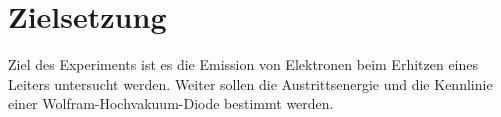 \section{Zielsetzung}
\label{sec:Zielsetzung}

Ziel des Experiments ist es die Emission von Elektronen beim Erhitzen eines Leiters untersucht werden. Weiter sollen die Austrittsenergie und die Kennlinie einer Wolfram-Hochvakuum-Diode bestimmt werden.